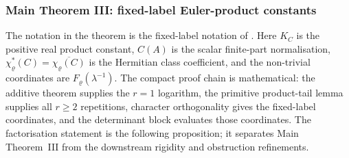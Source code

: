 \documentclass[11pt,a4paper]{amsart}
\theoremstyle{plain}
\theoremstyle{definition}
\theoremstyle{remark}
\begin{document}
\subsubsection{Main Theorem III: fixed-label Euler-product constants}
\label{subsubsec:main-iii-fixed-label-products}

The notation in the theorem is the fixed-label notation of
.  Here \(K_C\) is the positive
real product constant, \(C(A)\) is the scalar finite-part normalisation,
\(\chi_\varrho^\ast(C)=\overline{\chi_\varrho(C)}\) is the Hermitian class
coefficient, and the non-trivial coordinates are
\(F_\varrho(\lambda^{-1})\).  The compact proof chain is mathematical: the
additive theorem supplies the \(r=1\) logarithm, the primitive product-tail
lemma supplies all \(r\ge2\) repetitions, character orthogonality gives the
fixed-label coordinates, and the determinant block evaluates those
coordinates.  The factorisation statement is the following proposition; it
separates Main Theorem~III from the downstream rigidity and obstruction
refinements.
\end{document}
